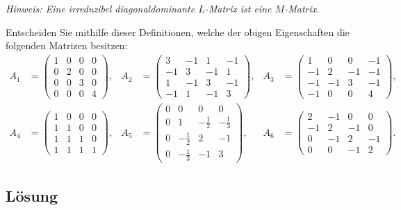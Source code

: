 \documentclass{exercise}
\begin{document}
\begin{problem}
\begin{itemize}
            \emph{Hinweis: Eine irreduzibel diagonaldominante \(L\)-Matrix ist eine \(M\)-Matrix.}
        \end{itemize}
        Entscheiden Sie mithilfe dieser Definitionen, welche der obigen Eigenschaften die folgenden Matrizen besitzen:
        \begin{align*}
            A_1 &= \begin{pmatrix}
                1 & 0 & 0 & 0\\
                0 & 2 & 0 & 0\\
                0 & 0 & 3 & 0\\
                0 & 0 & 0 & 4
            \end{pmatrix}, & A_2 &= \begin{pmatrix}
                3 & -1 & 1 & -1\\
                -1 & 3 & -1 & 1\\
                1 & -1 & 3 & -1\\
                -1 & 1 & -1 & 3
            \end{pmatrix}, & A_3 &= \begin{pmatrix}
                1 & 0 & 0 & -1\\
                -1 & 2 & -1 & -1\\
                -1 & -1 & 3 & -1\\
                -1 & 0 & 0 & 4
            \end{pmatrix},\\
            A_4 &= \begin{pmatrix}
                1 & 0 & 0 & 0\\
                1 & 1 & 0 & 0\\
                1 & 1 & 1 & 0\\
                1 & 1 & 1 & 1
            \end{pmatrix}, & A_5 &= \begin{pmatrix}
                0 & 0 & 0 & 0\\
                0 & 1 & -\frac{1}{2} & -\frac{1}{3}\\
                0 & -\frac{1}{2} & 2 & -1\\
                0 & -\frac{1}{3} & -1 & 3
            \end{pmatrix}, & A_6 &= \begin{pmatrix}
                2 & -1 & 0 & 0\\
                -1 & 2 & -1 & 0\\
                0 & -1 & 2 & -1\\
                0 & 0 & -1 & 2
            \end{pmatrix}.
        \end{align*}
    \end{problem}
    
    \subsection*{Lösung}
\end{document}
